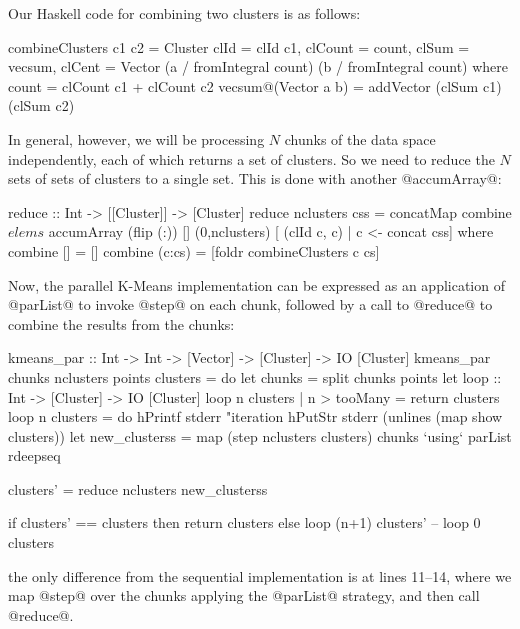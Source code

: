 Our Haskell code for combining two clusters is as follows:

\begin{haskell}
combineClusters c1 c2 =
  Cluster {clId = clId c1,
           clCount = count,
           clSum = vecsum,
           clCent = Vector (a / fromIntegral count)
                           (b / fromIntegral count)}
  where count = clCount c1 + clCount c2
        vecsum@(Vector a b)  = addVector (clSum c1) (clSum c2)
\end{haskell}

\noindent In general, however, we will be processing $N$ chunks of the
data space independently, each of which returns a set of clusters.  So
we need to reduce the $N$ sets of sets of clusters to a single set.
This is done with another @accumArray@:

\begin{haskell}
reduce :: Int -> [[Cluster]] -> [Cluster]
reduce nclusters css =
  concatMap combine $ elems $
    accumArray (flip (:)) [] (0,nclusters)
       [ (clId c, c) | c <- concat css]
 where
  combine [] = []
  combine (c:cs) = [foldr combineClusters c cs]
\end{haskell}

Now, the parallel K-Means implementation can be expressed as an
application of @parList@ to invoke @step@ on each chunk, followed by a
call to @reduce@ to combine the results from the chunks:

\begin{numhaskell}
kmeans_par :: Int -> Int -> [Vector] -> [Cluster]
           -> IO [Cluster]
kmeans_par chunks nclusters points clusters = do
  let chunks = split chunks points
  let
      loop :: Int -> [Cluster] -> IO [Cluster]
      loop n clusters | n > tooMany = return clusters
      loop n clusters = do
        hPrintf stderr "iteration %
        hPutStr stderr (unlines (map show clusters))
        let
             new_clusterss =
                map (step nclusters clusters) chunks
                   `using` parList rdeepseq

             clusters' = reduce nclusters new_clusterss

        if clusters' == clusters
           then return clusters
           else loop (n+1) clusters'
  --
  loop 0 clusters
\end{numhaskell}

\noindent the only difference from the sequential implementation is at
lines 11--14, where we map @step@ over the chunks applying the
@parList@ strategy, and then call @reduce@.

